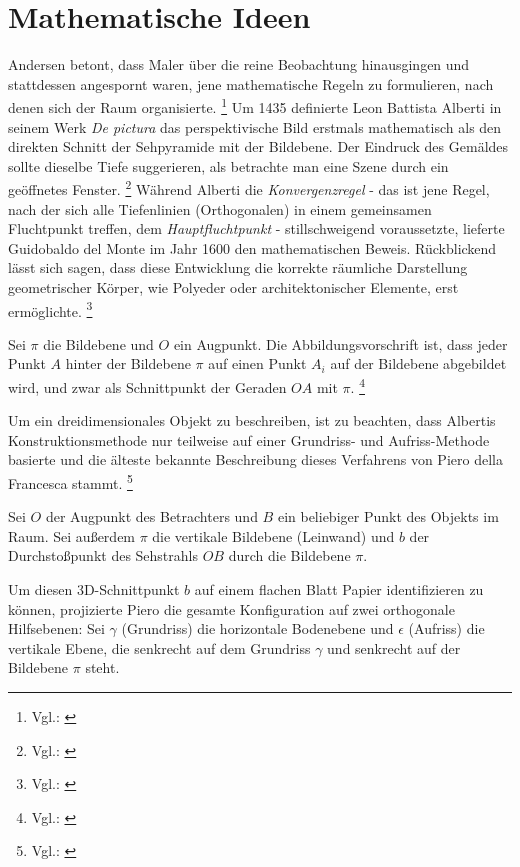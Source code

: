 \section{Mathematische Ideen}

Andersen betont, dass Maler über die reine Beobachtung hinausgingen und stattdessen angespornt waren, jene mathematische Regeln zu formulieren, nach denen sich der Raum organisierte. \footnote{Vgl.: \cite[S. 3]{Andersen2007}}
Um 1435 definierte Leon Battista Alberti in seinem Werk \textit{De pictura} das perspektivische Bild erstmals mathematisch als den direkten Schnitt der Sehpyramide mit der Bildebene. Der Eindruck des Gemäldes sollte dieselbe Tiefe suggerieren, als betrachte man eine Szene durch ein geöffnetes Fenster. \footnote{Vgl.: \cite[S. 1]{Andersen2007}} Während Alberti die \textit{Konvergenzregel} - das ist jene Regel, nach der sich alle Tiefenlinien (Orthogonalen) in einem gemeinsamen Fluchtpunkt treffen, dem \textit{Hauptfluchtpunkt} - stillschweigend voraussetzte, lieferte Guidobaldo del Monte im Jahr 1600 den mathematischen Beweis. Rückblickend lässt sich sagen, dass diese Entwicklung die korrekte räumliche Darstellung geometrischer Körper, wie Polyeder oder architektonischer Elemente, erst ermöglichte. \footnote{Vgl.: \cite[S. 4-9]{Andersen2007}}

Sei $\pi$ die Bildebene und $O$ ein Augpunkt. Die Abbildungsvorschrift ist, dass jeder Punkt $A$ hinter der Bildebene $\pi$ auf einen Punkt $A_i$ auf der Bildebene abgebildet wird, und zwar als Schnittpunkt der Geraden $OA$ mit $\pi$. \footnote{Vgl.: \cite[S. 1]{Andersen2007}}

Um ein dreidimensionales Objekt zu beschreiben, ist zu beachten, dass Albertis Konstruktionsmethode nur teilweise auf einer Grundriss- und Aufriss-Methode basierte und die älteste bekannte Beschreibung dieses Verfahrens von Piero della Francesca stammt. \footnote{Vgl.: \cite[S. 14]{Andersen2007}}

Sei $O$ der Augpunkt des Betrachters und $B$ ein beliebiger Punkt des Objekts im Raum. Sei außerdem $\pi$ die vertikale Bildebene (Leinwand) und $b$ der Durchstoßpunkt des Sehstrahls $OB$ durch die Bildebene $\pi$.

Um diesen 3D-Schnittpunkt $b$ auf einem flachen Blatt Papier identifizieren zu können, projizierte Piero die gesamte Konfiguration auf zwei orthogonale Hilfsebenen: Sei $\gamma$ (Grundriss) die horizontale Bodenebene und $\epsilon$ (Aufriss) die vertikale Ebene, die senkrecht auf dem Grundriss $\gamma$ und senkrecht auf der Bildebene $\pi$ steht. 

